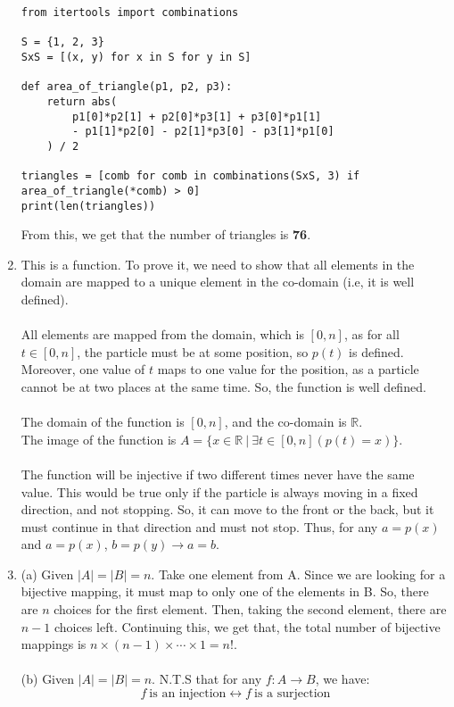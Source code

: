 \documentclass[a4paper]{article}
\begin{document}
\begin{enumerate}
\begin{verbatim}
from itertools import combinations

S = {1, 2, 3}
SxS = [(x, y) for x in S for y in S]

def area_of_triangle(p1, p2, p3):
    return abs(
        p1[0]*p2[1] + p2[0]*p3[1] + p3[0]*p1[1]
        - p1[1]*p2[0] - p2[1]*p3[0] - p3[1]*p1[0]
    ) / 2

triangles = [comb for comb in combinations(SxS, 3) if area_of_triangle(*comb) > 0]
print(len(triangles))
\end{verbatim}

From this, we get that the number of triangles is \textbf{76}.


\item This is a function. To prove it, we need to show that all elements in the domain are mapped to a unique element in the co-domain (i.e, it is well defined).\\
\\
All elements are mapped from the domain, which is $[0, n]$, as for all $t \in [0, n]$, the particle must be at some position, so $p(t)$ is defined. Moreover, one value of $t$ maps to one value for the position, as a particle cannot be at two places at the same time. So, the function is well defined.\\
\\
The domain of the function is $[0, n]$, and the co-domain is $\mathbb{R}$.\\
The image of the function is $A = \{ x \in \mathbb{R}\ |\ \exists t \in [0, n] (p(t) = x) \}$.\\
\\
The function will be injective if two different times never have the same value. This would be true only if the particle is always moving in a fixed direction, and not stopping. So, it can move to the front or the back, but it must continue in that direction and must not stop. Thus, for any $a = p(x)$ and $a = p(x)$, $b = p(y) \rightarrow a = b$.

\item (a) Given $|A| = |B| = n$. Take one element from A. Since we are looking for a bijective mapping, it must map to only one of the elements in B. So, there are $n$ choices for the first element. Then, taking the second element, there are $n-1$ choices left. Continuing this, we get that, the total number of bijective mappings is $n\times (n-1) \times \cdots \times 1= n!$.\\
\\
(b) Given $|A| = |B| = n$. N.T.S that for any $f: A \rightarrow B$, we have:\\
$$f\ \text{is an injection} \leftrightarrow f\ \text{is a surjection}$$


\end{enumerate}
\end{document}

